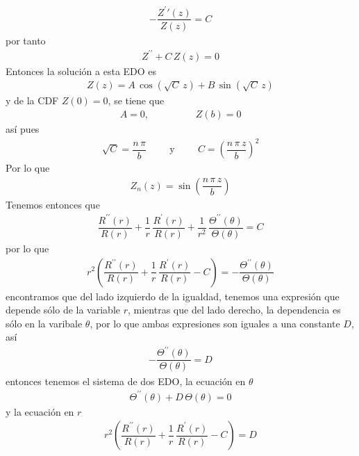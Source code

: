 \begin{align*}
- \dfrac{Z^{\prime}{\prime}(z)}{Z(z)} = C
\end{align*}
por tanto
\begin{align*}
Z^{\prime \prime} + C \, Z (z) = 0
\end{align*}
Entonces la solución a esta EDO es
\begin{align*}
Z (z) = A \, \cos (\sqrt{C} \, z) + B \, \sin (\sqrt{C} \, z)
\end{align*}
y de la CDF $Z(0) = 0$, se tiene que
\begin{align*}
A = 0, \hspace{2cm} Z(b) = 0
\end{align*}
así pues
\begin{align*}
\sqrt{C} = \dfrac{n \, \pi}{b} \hspace{1cm} \text{y} \hspace{1cm} C = \left( \dfrac{n \, \pi \, z}{b} \right)^{2}
\end{align*}
Por lo que
\begin{align*}
Z_{n} (z) = \sin \left( \dfrac{n \, \pi \, z}{b} \right)
\end{align*}
Tenemos entonces que
\begin{align*}
\dfrac{R^{\prime \prime}(r)}{R(r)} + \dfrac{1}{r} \, \dfrac{R^{\prime} (r)}{R (r)} + \dfrac{1}{r^{2}} \, \dfrac{\Theta^{\prime \prime} (\theta)}{\Theta (\theta)} = C
\end{align*}
por lo que
\begin{align*}
r^{2} \left( \dfrac{R^{\prime \prime}(r)}{R(r)} + \dfrac{1}{r} \, \dfrac{R^{\prime} (r)}{R (r)}  - C\right) = - \dfrac{\Theta^{\prime \prime} (\theta)}{\Theta (\theta)}
\end{align*}
encontramos que del lado izquierdo de la igualdad, tenemos una expresión que depende sólo de la variable $r$, mientras que del lado derecho, la dependencia es sólo en la varibale $\theta$, por lo que ambas expresiones son iguales a una constante $D$, así
\begin{align*}
- \dfrac{\Theta^{\prime \prime} (\theta)}{\Theta (\theta)} = D
\end{align*}
entonces tenemos el sistema de dos EDO, la ecuación en $\theta$
\begin{align*}
\Theta^{\prime \prime} (\theta) + D \, \Theta (\theta) = 0
\end{align*}
y la ecuación en $r$
\begin{align}
r^{2} \left( \dfrac{R^{\prime \prime}(r)}{R(r)} + \dfrac{1}{r} \, \dfrac{R^{\prime} (r)}{R (r)}  - C\right) = D
\label{eq:ecuacion_018}
\end{align}

